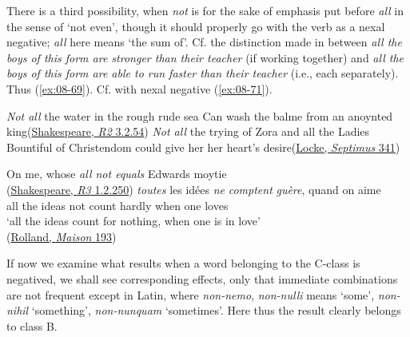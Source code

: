 There is a third possibility, when \textit{not} is for the sake of emphasis put before \textit{all} in the sense of `not even', though it should properly go with the verb as a nexal negative; \textit{all} here means `the sum of'. Cf. the distinction made in \citet[\href{https://archive.org/details/jespersen-1954-a-modern-english-grammar-on-historical-principles-part-ii-syntax-first-volume/page/130/mode/2up?view=theater}{5.4}]{jespersenMEG2} between \textit{all the boys of this form are stronger than their teacher} (if working together) and \textit{all the boys of this form are able to run faster than their teacher} (i.e., each separately). Thus (\ref{ex:08-69}). Cf. with nexal negative (\ref{ex:08-71}).

\ea \label{ex:08-69}
\ea
\emph{Not all} the water in the rough rude sea Can wash the balme from an anoynted king\hfill(\href{https://internetshakespeare.uvic.ca/doc/R2_F1/scene/3.2/index.html#tln-1405}{Shakespeare, \textit{R2} 3.2.54}) %
\ex
\emph{Not all} the trying of Zora and all the Ladies Bountiful of Christendom could give her her heart's desire\hfill(\href{https://archive.org/details/septimus00unkngoog/page/n315/mode/2up?q=%22trying+of+zora%22&view=theater}{Locke, \textit{Septimus} 341})
\z
\z

\ea \label{ex:08-71}
\ea
On me, whose \emph{all not equals} Edwards moytie\\\hfill(\href{https://internetshakespeare.uvic.ca/doc/R3_F1/scene/1.2/index.html#tln-445}{Shakespeare, \textit{R3} 1.2.250}) %
\ex
\gll \emph{toutes} les idées \emph{ne} \emph{comptent} \emph{guère}, quand on aime\\
 all the ideas not count hardly when one loves\\
\glt `all the ideas count for nothing, when one is in love'\\\hfill(\href{https://www.gutenberg.org/cache/epub/61970/pg61970-images.html}{Rolland, \textit{Maison} 193}) 
\z
\z
{}

\label{08-non-nulli}If now we examine what results when a word belonging to the C-class is negatived, we shall see corresponding effects, only that immediate combinations are not frequent except in Latin, where \textit{non-nemo}, \textit{non-nulli} means `some', \textit{non-nihil} `something', \textit{non-nunquam} `sometimes'. Here thus the result clearly belongs to class B.

